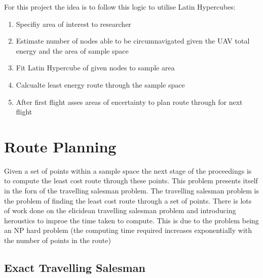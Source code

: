 \documentclass[a4paper,12pt,twoside]{article}
\begin{document}
For this project the idea is to follow this logic to utilise Latin Hypercubes:

\begin{enumerate}
\setlength{\itemsep}{-10pt}
\item Specifiy area of interest to researcher
\item Estimate number of nodes able to be circumnavigated given the UAV total energy and the area of sample space
\item Fit Latin Hypercube of given nodes to sample area
\item Calcualte least energy route through the sample space
\item After first flight asses areas of encertainty to plan route through for next flight

\end{enumerate}

\section{Route Planning}
\label{sec:route_planning}

Given a set of points within a sample space the next stage of the proceedings is to compute the least cost route through these points. This problem presents itself in the forn of the travelling salesman problem. The travelling salesman problem is the problem of finding the least cost route through a set of points. There is lots of work done on the elicidean travelling salesman problem and introducing heroustics to improe the time taken to compute. This is due to the problem being an NP hard problem (the computing time required increases exponentially with the number of points in the route)

\subsection{Exact Travelling Salesman}
\label{sec:exact_travelling_salesman}
\end{document}
